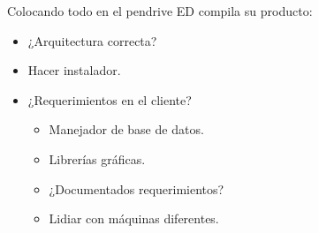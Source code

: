 \begin{frame}{Colocando todo en el pendrive}
  ED compila su producto:
  \begin{itemize}
    \item ¿Arquitectura correcta?
    \item Hacer instalador.
    \item ¿Requerimientos en el cliente?
    \begin{itemize}
      \item Manejador de base de datos.
      \item Librerías gráficas.
      \item ¿Documentados requerimientos?
      \item Lidiar con máquinas diferentes.
    \end{itemize}
  \end{itemize}
\end{frame}
